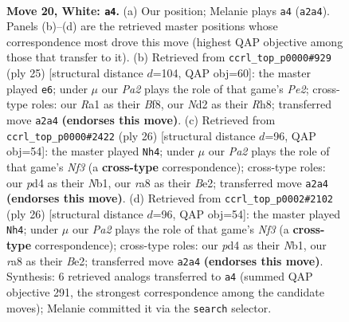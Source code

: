 \documentclass[11pt]{article}
\begin{document}
\clearpage

\begin{figure}[p]\centering
\begin{subfigure}{0.46\textwidth}\centering
\resizebox{\linewidth}{!}{%
\newchessgame
\chessboard[
  setfen={r1b1r1k1/p2nb2p/2p2pp1/1p1q4/3p3P/1P1Q1PP1/P2NPK2/RNB2R2 w - - 2 20},
  showmover=false,
  pgfstyle=straightmove, color=movearrow, markmove={a2-a4}
]}
\caption{}
\end{subfigure}\hfill
\begin{subfigure}{0.46\textwidth}\centering
\resizebox{\linewidth}{!}{%
\newchessgame
\chessboard[
  setfen={2kr1bnr/1pqnp1p1/p1p4p/3pP2P/6P1/3Q1N2/PPP1NP2/R1B1K2R b KQ - 0 13},
  showmover=false,
  pgfstyle=straightmove, color=movearrow, markmove={e7-e6}
]}
\caption{}
\end{subfigure}
\\[4pt]
\begin{subfigure}{0.46\textwidth}\centering
\resizebox{\linewidth}{!}{%
\newchessgame
\chessboard[
  setfen={rn2k2r/p4qpp/1pp1p3/3p1b2/3P1b2/1QP2N2/PP2BPPP/RN3RK1 w kq - 0 14},
  showmover=false,
  pgfstyle=straightmove, color=movearrow, markmove={f3-h4}
]}
\caption{}
\end{subfigure}\hfill
\begin{subfigure}{0.46\textwidth}\centering
\resizebox{\linewidth}{!}{%
\newchessgame
\chessboard[
  setfen={rn2k2r/p4qpp/1pp1p3/3p1b2/3P1b2/1QP2N2/PP2BPPP/RN3RK1 w kq - 0 14},
  showmover=false,
  pgfstyle=straightmove, color=movearrow, markmove={f3-h4}
]}
\caption{}
\end{subfigure}
\caption{\textbf{Move 20, White: \texttt{a4}.} (a) Our position; Melanie plays \texttt{a4} (\texttt{a2a4}). Panels (b)--(d) are the retrieved master positions whose correspondence most drove this move (highest QAP objective among those that transfer to it). (b) Retrieved from \texttt{ccrl\_top\_p0000\#929} (ply 25) [structural distance $d$=104, QAP obj=60]: the master played \texttt{e6}; under $\mu$ our \emph{Pa2} plays the role of that game's \emph{Pe2}; cross-type roles: our \emph{R}a1 as their \emph{B}f8, our \emph{N}d2 as their \emph{R}h8; transferred move \texttt{a2a4} \textbf{(endorses this move)}. (c) Retrieved from \texttt{ccrl\_top\_p0000\#2422} (ply 26) [structural distance $d$=96, QAP obj=54]: the master played \texttt{Nh4}; under $\mu$ our \emph{Pa2} plays the role of that game's \emph{Nf3} (a \textbf{cross-type} correspondence); cross-type roles: our \emph{p}d4 as their \emph{N}b1, our \emph{r}a8 as their \emph{B}e2; transferred move \texttt{a2a4} \textbf{(endorses this move)}. (d) Retrieved from \texttt{ccrl\_top\_p0002\#2102} (ply 26) [structural distance $d$=96, QAP obj=54]: the master played \texttt{Nh4}; under $\mu$ our \emph{Pa2} plays the role of that game's \emph{Nf3} (a \textbf{cross-type} correspondence); cross-type roles: our \emph{p}d4 as their \emph{N}b1, our \emph{r}a8 as their \emph{B}e2; transferred move \texttt{a2a4} \textbf{(endorses this move)}. Synthesis: 6 retrieved analogs transferred to \texttt{a4} (summed QAP objective 291, the strongest correspondence among the candidate moves); Melanie committed it via the \texttt{search} selector.}
\label{fig:thought-m38}
\end{figure}
\end{document}
